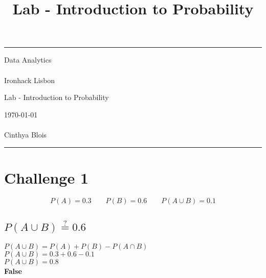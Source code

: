 \documentclass[a4paper]{article} %
\begin{document}

\title{Lab - Introduction to Probability} %
\fancyhead[C]{}
\hrule \medskip %
\begin{minipage}{0.295\textwidth} %
\raggedright
Data Analytics\\ %
\footnotesize %
\hfill\\
Ironhack Lisbon %
\end{minipage}
\begin{minipage}{0.4\textwidth} %
\centering 
\large %
Lab - Introduction to Probability\\ %
\normalsize %
\end{minipage}
\begin{minipage}{0.295\textwidth} %
\raggedleft
\today\\ %
\footnotesize %
\hfill\\
Cinthya Blois %
\end{minipage}
\medskip\hrule %
\bigskip

\section{Challenge 1}
\begin{equation}
    P(A) = 0.3 \qquad
    P(B) = 0.6 \qquad
    P(A \cup B) = 0.1 \nonumber
\end{equation}

\subsection{$P(A \cup B) \stackrel{?}{=} 0.6$}
$P(A \cup B) = P(A) + P(B) - P(A \cap B)$ \\
$P(A \cup B) = 0.3 + 0.6 - 0.1$ \\
$P(A \cup B) = 0.8$ \\
\textbf{False}
\end{document}
